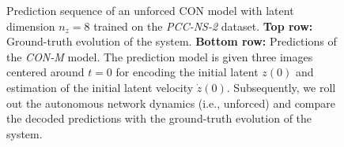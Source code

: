 \begin{figure}[hb]
    \caption{Prediction sequence of an unforced \gls{CON} model with latent dimension $n_z=8$ trained on the \emph{PCC-NS-2} dataset. 
    \textbf{Top row:} Ground-truth evolution of the system. \textbf{Bottom row:} Predictions of the \emph{CON-M} model. \newline
    The prediction model is given three images centered around $t=0$ for encoding the initial latent $z(0)$ and estimation of the initial latent velocity $\dot{z}(0)$. Subsequently, we roll out the autonomous network dynamics (i.e., unforced) and compare the decoded predictions with the ground-truth evolution of the system.  
    }\label{fig:apx-con:latent_dynamics:sequence_of_stills:pcc_ns-2:rollout2}
\end{figure}


